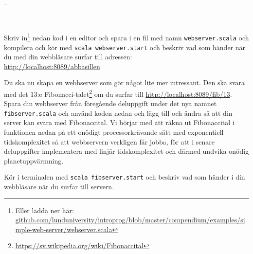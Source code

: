 \SOLUTION

\TaskSolved --

\QUESTEND






\QUESTBEGIN

\Task  \what~

\Subtask Skriv in\footnote{Eller ladda ner här: \href{https://github.com/lunduniversity/introprog/blob/master/compendium/examples/simple-web-server/webserver.scala}{github.com/lunduniversity/introprog/blob/master/compendium/examples/simple-web-server/webserver.scala}} nedan kod i en editor och spara i en fil med namn \texttt{webserver.scala} och kompilera och kör med \texttt{scala webserver.start} och beskriv vad som händer när du med din webbläsare surfar till adressen: \\ \url{http://localhost:8089/abbasillen}


\Subtask Du ska nu skapa en webbserver som gör något lite mer intressant. Den ska svara med det 13:e Fibonacci-talet\footnote{\href{https://sv.wikipedia.org/wiki/Fibonaccital}{https://sv.wikipedia.org/wiki/Fibonaccital}} om du surfar till \url{http://localhost:8089/fib/13}.
Spara din webbserver från föregående deluppgift under det nya namnet \texttt{fibserver.scala} och använd koden nedan och lägg till och ändra så att din server kan svara med Fibonaccital. Vi börjar med att räkna ut Fibonaccital i funktionen  nedan på ett onödigt processorkrävande sätt med exponentiell tidskomplexitet så att webbservern verkligen får jobba, för att i senare deluppgifter implementera  med linjär tidskomplexitet och därmed undvika onödig planetuppvärmning.
Kör i terminalen med \texttt{scala fibserver.start} och beskriv vad som händer i din webbläsare när du surfar till servern.


